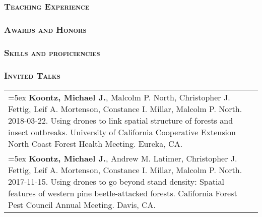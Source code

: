 \documentclass[10pt,english]{article}
\providecommand{\tabularnewline}{\\}
\begin{document}
\vspace{1ex}


\subsubsection*{\textsc{Teaching Experience}}
\vspace{-0.5ex}


\vspace{1ex}


\subsubsection*{\textsc{Awards and Honors}}


\vspace{1ex}


\subsubsection*{\textsc{Skills and proficiencies}}
\vspace{-0.5ex}


\vspace{1ex}


\subsubsection*{\textsc{Invited Talks}}
\vspace{-0.5ex}

\renewcommand{\arraystretch}{1.2}
\begin{tabularx}{\textwidth}{@{}>{\raggedright}p{5.25in} >{\raggedleft}X@{}}

\hangindent=5ex \textbf{Koontz, Michael J.}, Malcolm P. North, Christopher J. Fettig, Leif A. Mortenson, Constance I. Millar, Malcolm P. North. 2018-03-22. Using drones to link spatial structure of forests and insect outbreaks. University of California Cooperative Extension North Coast Forest Health Meeting. Eureka, CA. & 2018 \tabularnewline

\hangindent=5ex \textbf{Koontz, Michael J.}, Andrew M. Latimer, Christopher J. Fettig, Leif A. Mortenson, Constance I. Millar, Malcolm P. North. 2017-11-15. Using drones to go beyond stand density: Spatial features of western pine beetle-attacked forests. California Forest Pest Council Annual Meeting. Davis, CA. & 2017

\end{tabularx}
\vspace{1ex}
\end{document}
